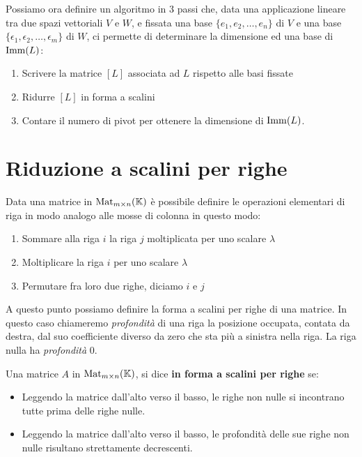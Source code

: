 \begin{observation}
	Possiamo ora definire un algoritmo in 3 passi che, data una
	applicazione lineare tra due spazi vettoriali $V$ e $W$, e fissata una base
	$\{e_1, e_2, \dots, e_n\}$ di $V$ e una base
	$\{\epsilon_1, \epsilon_2, \dots, \epsilon_m\}$ di $W$, ci permette di
	determinare la dimensione ed una base di $\operatorname{Imm}(L)$:
	\begin{enumerate}
		\item Scrivere la matrice $[L]$ associata ad $L$ rispetto alle basi
		      fissate
		\item Ridurre $[L]$ in forma a scalini
		\item Contare il numero di pivot per ottenere la dimensione di $\operatorname{Imm}(L)$.
	\end{enumerate}
\end{observation}

\section{Riduzione a scalini per righe}
Data una matrice in $\operatorname{Mat}_{m \times n}(\mathbb{K})$ è possibile definire le
operazioni elementari di riga in modo analogo alle mosse di colonna in questo
modo:
\begin{enumerate}
	\item Sommare alla riga $i$ la riga $j$ moltiplicata per uno scalare $\lambda$
	\item Moltiplicare la riga $i$ per uno scalare $\lambda$
	\item Permutare fra loro due righe, diciamo $i$ e $j$
\end{enumerate}
A questo punto possiamo definire la forma a scalini per righe di una matrice.
In questo caso chiameremo \emph{profondità} di una riga la posizione occupata,
contata da destra, dal suo coefficiente diverso da zero che sta più a sinistra
nella riga. La riga nulla ha \emph{profondità} 0.

\begin{definition}
	Una matrice $A$ in $\operatorname{Mat}_{m \times n}(\mathbb{K})$, si dice \textbf{in forma
		a scalini per righe} se:
	\begin{itemize}
		\item Leggendo la matrice dall'alto verso il basso, le righe non nulle si
		      incontrano tutte prima delle righe nulle.
		\item Leggendo la matrice dall'alto verso il basso, le profondità
		      delle sue righe non nulle risultano strettamente decrescenti.
	\end{itemize}
\end{definition}

